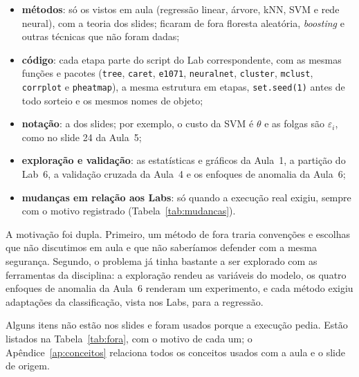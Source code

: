 \documentclass[12pt,a4paper]{article}
\begin{document}
\begin{itemize}
  \item \textbf{métodos}: só os vistos em aula (regressão linear, árvore, kNN, SVM e rede neural), com a teoria dos slides; ficaram de fora floresta aleatória, \textit{boosting} e outras técnicas que não foram dadas;
  \item \textbf{código}: cada etapa parte do script do Lab correspondente, com as mesmas funções e pacotes (\texttt{tree}, \texttt{caret}, \texttt{e1071}, \texttt{neuralnet}, \texttt{cluster}, \texttt{mclust}, \texttt{corrplot} e \texttt{pheatmap}), a mesma estrutura em etapas, \texttt{set.seed(1)} antes de todo sorteio e os mesmos nomes de objeto;
  \item \textbf{notação}: a dos slides; por exemplo, o custo da SVM é $\theta$ e as folgas são $\varepsilon_i$, como no slide 24 da Aula~5;
  \item \textbf{exploração e validação}: as estatísticas e gráficos da Aula~1, a partição do Lab~6, a validação cruzada da Aula~4 e os enfoques de anomalia da Aula~6;
  \item \textbf{mudanças em relação aos Labs}: só quando a execução real exigiu, sempre com o motivo registrado (Tabela~\ref{tab:mudancas}).
\end{itemize}

A motivação foi dupla. Primeiro, um método de fora traria convenções e escolhas que não discutimos em aula e que não saberíamos defender com a mesma segurança. Segundo, o problema já tinha bastante a ser explorado com as ferramentas da disciplina: a exploração rendeu as variáveis do modelo, os quatro enfoques de anomalia da Aula~6 renderam um experimento, e cada método exigiu adaptações da classificação, vista nos Labs, para a regressão.

Alguns itens não estão nos slides e foram usados porque a execução pedia. Estão listados na Tabela~\ref{tab:fora}, com o motivo de cada um; o Apêndice~\ref{ap:conceitos} relaciona todos os conceitos usados com a aula e o slide de origem.
\end{document}
